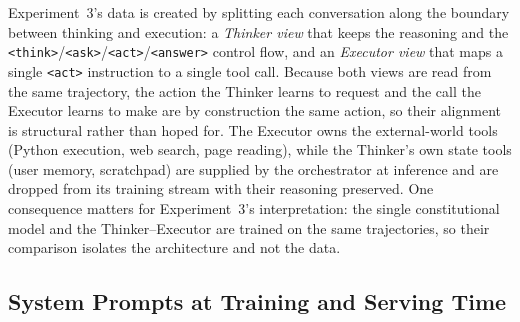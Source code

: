 
Experiment~3's data is created by splitting each conversation along the boundary between thinking and execution: a \emph{Thinker view} that keeps the reasoning and the \texttt{<think>}/\texttt{<ask>}/\texttt{<act>}/\texttt{<answer>} control flow, and an \emph{Executor view} that maps a single \texttt{<act>} instruction to a single tool call. Because both views are read from the same trajectory, the action the Thinker learns to request and the call the Executor learns to make are by construction the same action, so their alignment is structural rather than hoped for. The Executor owns the external-world tools (Python execution, web search, page reading), while the Thinker's own state tools (user memory, scratchpad) are supplied by the orchestrator at inference and are dropped from its training stream with their reasoning preserved. One consequence matters for Experiment~3's interpretation: the single constitutional model and the Thinker--Executor are trained on the same trajectories, so their comparison isolates the architecture and not the data.

\subsection{System Prompts at Training and Serving Time}
\label{subsec:mr-system-prompts}

